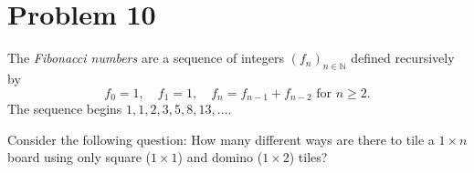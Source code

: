 \documentclass{article}
\theoremstyle{definition}
\begin{document}

\newpage


\section*{Problem 10}
The \emph{Fibonacci numbers} are a sequence of integers $\left(f_n\right)_{n\in\mathbb{N}}$ defined recursively by $$f_0=1,\quad f_1=1, \quad f_n=f_{n-1}+f_{n-2}\text{ for }n\geq2.$$ The sequence begins $1,1,2,3,5,8,13,\dots$. \bigskip

\noindent Consider the following question: How many different ways are there to tile a $1\times n$ board using only square ($1\times 1$) and domino ($1\times 2$) tiles?
\begin{center}
\end{center}
\end{document}
